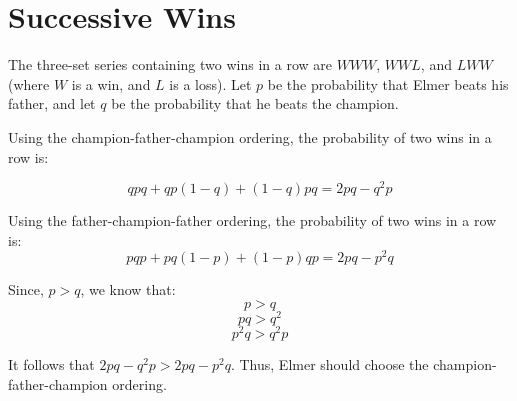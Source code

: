 \documentclass{article}
\date{}
\author{Kaan Aksoy | Feb 10, 2020}
\begin{document}
\maketitle

\section{Successive Wins}

The three-set series containing two wins in a row  
are $WWW$, $WWL$, and $LWW$ (where $W$ is a win, 
and $L$ is a loss). Let $p$ be the probability that Elmer beats his 
father, and let $q$ be the probability that he 
beats the champion. 

Using the champion-father-champion 
ordering, the probability of two wins in a row is:

$$qpq + qp(1-q) + (1-q)pq = 2pq-q^2p$$

Using the father-champion-father ordering, 
the probability of two wins in a row is:
$$pqp + pq(1-p) + (1-p)qp = 2pq - p^2q$$

Since, $p > q$, we know that:
$$ p > q $$
$$ pq > q^2 $$
$$ p^2q > q^2p $$

It follows that $2pq - q^2p > 2pq - p^2q$. Thus, Elmer 
should choose the champion-father-champion ordering.
\end{document}
